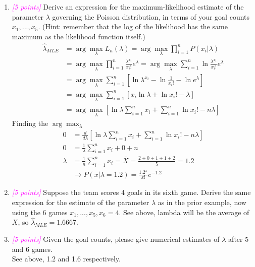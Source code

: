 \documentclass{article}
\newcommand{\argmax}{\arg\!\max}
\newcommand{\1}{\mathbf{1}}
\newcommand{\points}[1]{\small\textcolor{magenta}{\emph{[#1 points]}} \normalsize}
\begin{document}
\begin{enumerate}
	\item \points{5} Derive an expression for the maximum-likelihood estimate of the parameter $\lambda$ governing the Poisson distribution, in terms of your goal counts $x_1,...,x_5$. (Hint: remember that the log of the likelihood has the same maximum as the likelihood function itself.) \newline
	\begin{align*}
	    \widehat \lambda_{MLE} &= \argmax_\lambda L_n(\lambda) = \argmax_\lambda \prod_{i=1}^n P(x_i|\lambda) \\
	    &= \argmax_\lambda\prod_{i=1}^n \frac{\lambda^{x_i}}{x_i!}e^\lambda = \argmax_\lambda\sum_{i=1}^n \ln{\frac{\lambda^{x_i}}{x_i!}e^\lambda} \\
	    &= \argmax_\lambda\sum_{i=1}^n \left[\ln\lambda^{x_i} - \ln\frac{1}{x_i!} - \ln e^\lambda\right] \\
	    &= \argmax_\lambda\sum_{i=1}^n \left[x_i\ln\lambda + \ln x_i! - \lambda\right] \\
	    &= \argmax_\lambda \left[\ln\lambda\sum_{i=1}^n x_i + \sum_{i=1}^n\ln x_i! - n\lambda\right]
	\end{align*}
	Finding the $\argmax_\lambda$ 
	\begin{align*}
	    0 &= \frac{d}{d\lambda} \left[\ln\lambda\sum_{i=1}^n x_i + \sum_{i=1}^n\ln x_i! - n\lambda\right] \\
	    0 &= \frac{1}{\lambda}\sum_{i=1}^n x_i + 0 + n \\
	    \lambda &= \frac{1}{n}\sum_{i=1}^n x_i = \bar X = \frac{2+0+1+1+2}{5} = 1.2 \\
	    &\rightarrow P(x|\lambda=1.2)=\frac{1.2^x}{x!}e^{-1.2}
	\end{align*}
	
	\item \points{5} Suppose the team scores 4 goals in its sixth game.  Derive the same expression for the estimate of the parameter $\lambda$ as in the prior example, now using the 6 games $x_1,...,x_5,x_6=4$. \newline
	See above, lambda will be the average of $X$, so $\widehat \lambda_{MLE}=1.6667$.
	
	\item\points{5} Given the goal counts, please give numerical estimates of $\lambda$ after 5 and 6 games. \\
	See above, 1.2 and 1.6 respectively.
\end{enumerate}
\end{document}
